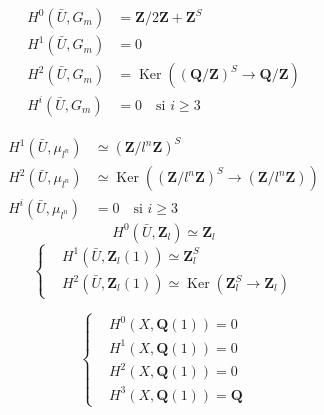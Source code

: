 
\begin{align*}
H^0(\bar U,G_m)&=\mathbf Z/2\mathbf Z+\mathbf Z^S\\
H^1(\bar U,G_m)&=0\\
H^2(\bar U,G_m)&=\operatorname{Ker}((\mathbf Q/\mathbf Z)^S\longrightarrow\mathbf Q/\mathbf Z)\\
H^i(\bar U,G_m)&=0\quad\text{si }i\geq3
\end{align*}


\begin{align*}
H^1(\bar U,\mu_{l^n})&\simeq(\mathbf Z/l^n\mathbf Z)^S\\
H^2(\bar U,\mu_{l^n})&\simeq\operatorname{Ker}((\mathbf Z/l^n\mathbf Z)^S\longrightarrow(\mathbf Z/l^n\mathbf Z))\\
H^i(\bar U,\mu_{l^n})&=0\quad\text{si }i\geq3
\end{align*}
\[
H^0(\bar U,\mathbf Z_l)\simeq\mathbf Z_l
\]
\[
\left\{\begin{aligned}
&H^1(\bar U,\mathbf Z_l(1))\simeq\mathbf Z_l^S\\
&H^2(\bar U,\mathbf Z_l(1))\simeq\operatorname{Ker}(\mathbf Z_l^S\longrightarrow\mathbf Z_l)
\end{aligned}\right.
\]

\[
\left\{\begin{aligned}
&H^0(X,\mathbf Q(1))=0\\
&H^1(X,\mathbf Q(1))=0\\
&H^2(X,\mathbf Q(1))=0\\
&H^3(X,\mathbf Q(1))=\mathbf Q
\end{aligned}\right.
\]

